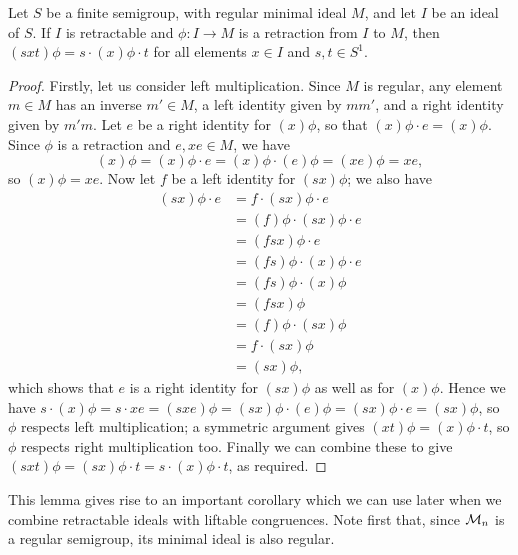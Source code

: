 \begin{lemma}
  \label{lem:retract-aux}
  Let $S$ be a finite semigroup, with regular minimal ideal $M$, and let $I$ be
  an ideal of $S$.  If $I$ is retractable and $\phi: I \rightarrow M$ is a
  retraction from $I$ to $M$, then $(sxt)\phi=s \cdot (x)\phi \cdot t$ for all
  elements $x\in I$ and $s,t\in S^1$.
  \begin{proof}
    Firstly, let us consider left multiplication.  Since $M$ is regular, any
    element $m \in M$ has an inverse $m' \in M$, a left identity given by $mm'$,
    and a right identity given by $m'm$.  Let $e$ be a right
    identity for $(x)\phi$, so that
    $(x)\phi \cdot e = (x)\phi$.
    Since $\phi$ is a retraction and $e, xe \in M$, we have
    $$(x)\phi=(x)\phi \cdot e = (x)\phi \cdot (e)\phi = (xe)\phi = xe,$$
    so $(x)\phi = xe$.  Now let $f$ be a left identity for $(sx)\phi$; we also
    have
    \begin{align*}
      (sx)\phi \cdot e & = f \cdot (sx)\phi \cdot e \\
      & = (f)\phi \cdot (sx)\phi \cdot e \\
      & = (fsx)\phi \cdot e \\
      & = (fs)\phi \cdot (x)\phi \cdot e \\
      & = (fs)\phi \cdot (x)\phi \\
      & = (fsx)\phi \\
      & = (f)\phi \cdot (sx)\phi \\
      & = f \cdot (sx)\phi \\
      & = (sx)\phi,
    \end{align*}
    which shows that $e$ is a right identity for $(sx)\phi$ as well as for
    $(x)\phi$.  Hence we have
    $s \cdot (x)\phi = s \cdot xe = (sxe)\phi = (sx)\phi \cdot (e)\phi =
    (sx)\phi \cdot e = (sx)\phi$, so $\phi$ respects left multiplication; a
    symmetric argument gives $(xt)\phi = (x)\phi \cdot t$, so $\phi$ respects
    right multiplication too.  Finally we can combine these to give
    $(sxt)\phi = (sx)\phi \cdot t = s \cdot (x)\phi \cdot t$, as required.
  \end{proof}
\end{lemma}

This lemma gives rise to an important corollary which we can use later when we
combine retractable ideals with liftable congruences.  Note first that, since
$\mathcal{M}_n$ is a regular semigroup, its minimal ideal is also regular.

